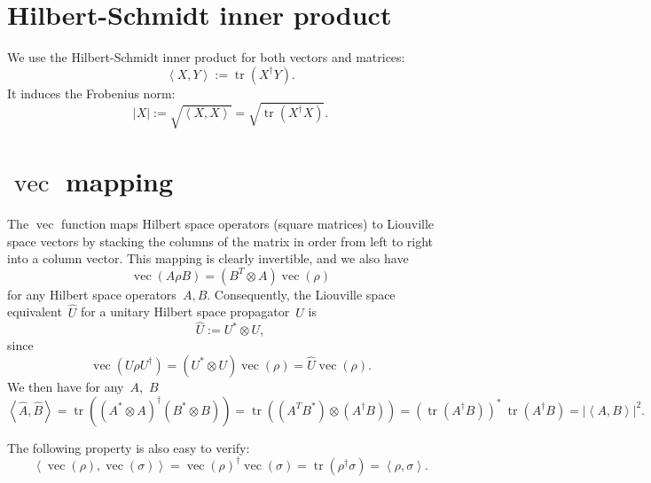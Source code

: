 \documentclass[aps, pra, a4paper, longbibliography]{revtex4}
\newcommand{\be}{\begin{equation}}
\newcommand{\ee}{\end{equation}}
\newcommand{\inprod}[2]{\left\langle #1, #2 \right\rangle}
\DeclareMathOperator{\tr}{tr}
\DeclareMathOperator{\cvec}{vec}
\begin{document}
\appendix
\section{Hilbert-Schmidt inner product}

We use the Hilbert-Schmidt inner product for both vectors and matrices:
\be
\inprod{X}{Y} := \tr\left(X^\dagger Y\right).
\ee
It induces the Frobenius norm:
\be
|X| := \sqrt{\inprod{X}{X}} = \sqrt{\tr\left(X^\dagger X\right)}.
\ee

\section{$\cvec$ mapping}
\label{sec:vec}

The $\cvec$ function maps Hilbert space operators (square matrices) to
Liouville space vectors by stacking the columns of the matrix in order
from left to right into a column vector. This mapping is clearly
invertible, and we also have
\be
\cvec(A \rho B) = (B^T \otimes A) \cvec(\rho)
\ee
for any Hilbert space operators~$A, B$.
Consequently, the Liouville space equivalent~$\hat{U}$ for a unitary Hilbert space
propagator~$U$ is
\be
\label{eq:L-unitary}
\hat{U} := U^* \otimes U,
\ee
since
\be
\cvec(U \rho U^\dagger) = (U^* \otimes U) \cvec(\rho) = \hat{U} \cvec(\rho).
\ee
We then have for any~$A$,~$B$
\be
\label{eq:hat-product}
\inprod{\hat{A}}{\hat{B}}
= \tr((A^* \otimes A)^\dagger (B^* \otimes B))
= \tr((A^T B^*) \otimes (A^\dagger B))
= (\tr(A^\dagger B))^* \: \tr(A^\dagger B)
= |\inprod{A}{B}|^2.
\ee

The following property is also easy to verify:
\be
\inprod{\cvec(\rho)}{\cvec(\sigma)} = \cvec(\rho)^\dagger \cvec(\sigma)
= \tr(\rho^\dagger \sigma) = \inprod{\rho}{\sigma}.
\ee






\end{document}

